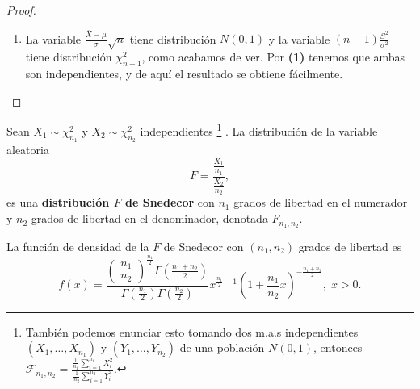 \begin{proof}
\begin{enumerate}
\[\frac{S^{2}_{2}}{\sigma^{2}}=\left(\frac{X_{2}-\overline{X}_{1}}{\sigma\sqrt{2}}\right)^{2}\sim\chi_{1}^{2} .\]
Supongamos ahora que es cierto para $\displaystyle n $, es decir
\[\frac{\left(n-1\right)S^{2}_{n}}{\sigma^{2}}\sim \chi_{n-1}^{2} .\]
Entonces, en el caso $\displaystyle n + 1 $ tenemos que 
\[\frac{nS^{2}_{n+1}}{\sigma^{2}}= \frac{\left(n-1\right)S^{2}_{n}}{\sigma^{2}} + \left(\frac{X_{n+1}-\overline{X}_{n}}{\sigma\sqrt{\frac{n+1}{n}}}\right)^{2}\sim\chi^{2}_{n-1} + \chi_{1}^{2} \sim \chi^{2}_{n} .\]
\item La variable $\displaystyle \frac{\overline{X}-\mu}{\sigma }\sqrt{n} $ tiene distribución $\displaystyle N\left(0,1\right) $ y la variable $\displaystyle \left(n-1\right)\frac{S^{2}}{\sigma^{2}} $ tiene distribución $\displaystyle \chi_{n-1}^{2} $, como acabamos de ver. Por \textbf{(1)} tenemos que ambas son independientes, y de aquí el resultado se obtiene fácilmente.
\end{enumerate}
\end{proof}
\begin{definition}
Sean $\displaystyle X_{1} \sim \chi_{n_{1}}^{2} $ y $\displaystyle X_{2}\sim \chi_{n_{2}}^{2} $ independientes \footnote{También podemos enunciar esto tomando dos m.a.s independientes $\displaystyle \left(X_{1}, \ldots, X_{n_{1}}\right) $ y $\displaystyle \left(Y_{1}, \ldots, Y_{n_{2}}\right) $ de una población $\displaystyle N\left(0,1\right) $, entonces $\displaystyle \mathcal{F}_{n_{1}, n_{2}}=\frac{\frac{1}{n_{1}} \sum^{n_{1}}_{i=1}X_{i}^{2}}{\frac{1}{n_{2}}\sum^{n_{2}}_{i = 1}Y_{i}^{2}} $.} . La distribución de la variable aleatoria
\[F = \frac{\frac{X_{1}}{n_{1}}}{\frac{X_{2}}{n_{2}}} ,\]
es una \textbf{distribución $\displaystyle F $ de Snedecor} con $\displaystyle n_{1} $ grados de libertad en el numerador y $\displaystyle n_{2} $ grados de libertad en el denominador, denotada $\displaystyle F_{n_{1}, n_{2}} $. 
\end{definition}
\begin{prop}
	La función de densidad de la $\displaystyle F $ de Snedecor con $\displaystyle \left(n_{1}, n_{2}\right) $ grados de libertad es
	\[f\left(x\right)=\frac{\begin{pmatrix} n_{1} \\ n_{2} \end{pmatrix}^{\frac{n_{1}}{2}}\Gamma\left(\frac{n_{1}+n_{2}}{2}\right)}{\Gamma\left(\frac{n_{1}}{2}\right)\Gamma\left(\frac{n_{2}}{2}\right)}x^{\frac{n_{1}}{2}-1}\left(1 + \frac{n_{1}}{n_{2}}x\right)^{-\frac{n_{1}+n_{2}}{2}}, \; x > 0 .\]
\end{prop}
